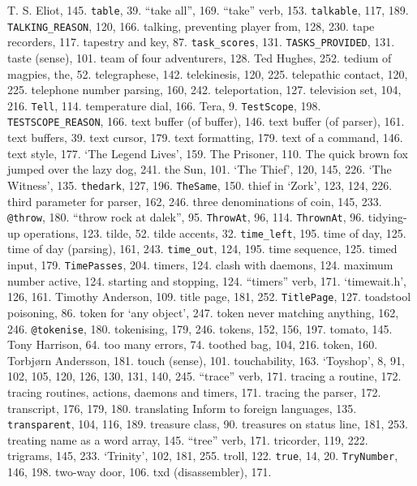 T. S. Eliot, 145.
{{\tt table}}, 39.
``take all'', 169.
``take'' verb, 153.
{{\tt talkable}}, 117, 189.
{{\tt TALKING\_REASON}}, 120, 166.
talking, preventing player from, 128, 230.
tape recorders, 117.
tapestry and key, 87.
{{\tt task\_scores}}, 131.
{{\tt TASKS\_PROVIDED}}, 131.
taste (sense), 101.
team of four adventurers, 128.
Ted Hughes, 252.
tedium of magpies, the, 52.
telegraphese, 142.
telekinesis, 120, 225.
telepathic contact, 120, 225.
telephone number parsing, 160, 242.
teleportation, 127.
television set, 104, 216.
{{\tt Tell}}, 114.
temperature dial, 166.
Tera, 9.
{{\tt TestScope}}, 198.
{{\tt TESTSCOPE\_REASON}}, 166.
text buffer (of buffer), 146.
text buffer (of parser), 161.
text buffers, 39.
text cursor, 179.
text formatting, 179.
text of a command, 146.
text style, 177.
`The Legend Lives', 159.
The Prisoner, 110.
The quick brown fox jumped over the lazy dog, 241.
the Sun, 101.
`The Thief', 120, 145, 226.
`The Witness', 135.
{{\tt thedark}}, 127, 196.
{{\tt TheSame}}, 150.
thief in `Zork', 123, 124, 226.
third parameter for parser, 162, 246.
three denominations of coin, 145, 233.
{{\tt @throw}}, 180.
``throw rock at dalek'', 95.
{{\tt ThrowAt}}, 96, 114.
{{\tt ThrownAt}}, 96.
tidying-up operations, 123.
tilde, 52.
tilde accents, 32.
{{\tt time\_left}}, 195.
time of day, 125.
time of day (parsing), 161, 243.
{{\tt time\_out}}, 124, 195.
time sequence, 125.
timed input, 179.
{{\tt TimePasses}}, 204.
timers, 124.
\quad  clash with daemons, 124.
\quad  maximum number active, 124.
\quad  starting and stopping, 124.
``timers'' verb, 171.
`timewait.h', 126, 161.
Timothy Anderson, 109.
title page, 181, 252.
{{\tt TitlePage}}, 127.
toadstool poisoning, 86.
token for `any object', 247.
token never matching anything, 162, 246.
{{\tt @tokenise}}, 180.
tokenising, 179, 246.
tokens, 152, 156, 197.
tomato, 145.
Tony Harrison, 64.
too many errors, 74.
toothed bag, 104, 216.
 token, 160.
Torbj\o rn Andersson, 181.
touch (sense), 101.
touchability, 163.
`Toyshop', 8, 91, 102, 105, 120, 126, 130, 131, 140, 245.
``trace'' verb, 171.
tracing a routine, 172.
tracing routines, actions, daemons and timers, 171.
tracing the parser, 172.
transcript, 176, 179, 180.
translating Inform to foreign languages, 135.
{{\tt transparent}}, 104, 116, 189.
treasure class, 90.
treasures on status line, 181, 253.
treating {\fam \ttfam \tentt name} as a word array, 145.
``tree'' verb, 171.
tricorder, 119, 222.
trigrams, 145, 233.
`Trinity', 102, 181, 255.
troll, 122.
{{\tt true}}, 14, 20.
{{\tt TryNumber}}, 146, 198.
two-way door, 106.
txd (disassembler), 171.

